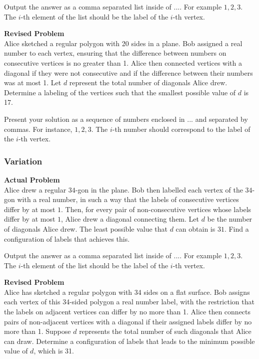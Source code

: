 Output the answer as a comma separated list inside of $\boxed{...}$. For example $\boxed{1, 2, 3}$.
The $i$-th element of the list should be the label of the $i$-th vertex.

\textbf{Revised Problem}\\
Alice sketched a regular polygon with 20 sides in a plane. Bob assigned a real number to each vertex, ensuring that the difference between numbers on consecutive vertices is no greater than 1. Alice then connected vertices with a diagonal if they were not consecutive and if the difference between their numbers was at most 1. Let $d$ represent the total number of diagonals Alice drew. Determine a labeling of the vertices such that the smallest possible value of $d$ is 17.

Present your solution as a sequence of numbers enclosed in $\boxed{...}$ and separated by commas. For instance, $\boxed{1, 2, 3}$. The $i$-th number should correspond to the label of the $i$-th vertex.

\subsubsection{Variation}
\textbf{Actual Problem}\\
Alice drew a regular $34$-gon in the plane. Bob then labelled each vertex of the $34$-gon with a real number, in such a way that the labels of consecutive vertices differ by at most $1$. Then, for every pair of non-consecutive vertices whose labels differ by at most $1$, Alice drew a diagonal connecting them. Let $d$ be the number of diagonals Alice drew. The least possible value that $d$ can obtain is $31$. Find a configuration of labels that achieves this.

Output the answer as a comma separated list inside of $\boxed{...}$. For example $\boxed{1, 2, 3}$.
The $i$-th element of the list should be the label of the $i$-th vertex.

\textbf{Revised Problem}\\
Alice has sketched a regular polygon with 34 sides on a flat surface. Bob assigns each vertex of this 34-sided polygon a real number label, with the restriction that the labels on adjacent vertices can differ by no more than 1. Alice then connects pairs of non-adjacent vertices with a diagonal if their assigned labels differ by no more than 1. Suppose $d$ represents the total number of such diagonals that Alice can draw. Determine a configuration of labels that leads to the minimum possible value of $d$, which is 31.

